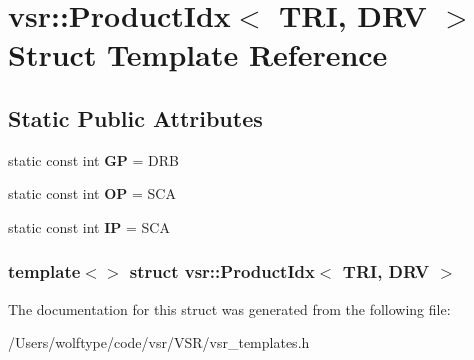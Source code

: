 \hypertarget{structvsr_1_1_product_idx_3_01_t_r_i_00_01_d_r_v_01_4}{\section{vsr\-:\-:Product\-Idx$<$ T\-R\-I, D\-R\-V $>$ Struct Template Reference}
\label{structvsr_1_1_product_idx_3_01_t_r_i_00_01_d_r_v_01_4}
}
\subsection*{Static Public Attributes}
\begin{DoxyCompactItemize}
\item 
\hypertarget{structvsr_1_1_product_idx_3_01_t_r_i_00_01_d_r_v_01_4_aef8d1693d05731459fec8989ef4d69cc}{static const int {\bfseries G\-P} = D\-R\-B}\label{structvsr_1_1_product_idx_3_01_t_r_i_00_01_d_r_v_01_4_aef8d1693d05731459fec8989ef4d69cc}

\item 
\hypertarget{structvsr_1_1_product_idx_3_01_t_r_i_00_01_d_r_v_01_4_a97550fb62dc05f713bec863058cb56a5}{static const int {\bfseries O\-P} = S\-C\-A}\label{structvsr_1_1_product_idx_3_01_t_r_i_00_01_d_r_v_01_4_a97550fb62dc05f713bec863058cb56a5}

\item 
\hypertarget{structvsr_1_1_product_idx_3_01_t_r_i_00_01_d_r_v_01_4_a97ac00f9b2d368babd37eddef9218351}{static const int {\bfseries I\-P} = S\-C\-A}\label{structvsr_1_1_product_idx_3_01_t_r_i_00_01_d_r_v_01_4_a97ac00f9b2d368babd37eddef9218351}

\end{DoxyCompactItemize}
\subsubsection*{template$<$$>$ struct vsr\-::\-Product\-Idx$<$ T\-R\-I, D\-R\-V $>$}



The documentation for this struct was generated from the following file\-:\begin{DoxyCompactItemize}
\item 
/\-Users/wolftype/code/vsr/\-V\-S\-R/vsr\-\_\-templates.\-h\end{DoxyCompactItemize}
